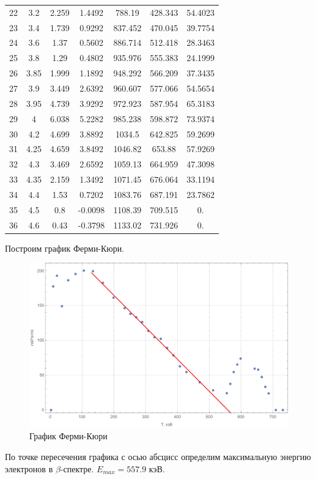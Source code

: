 \documentclass[a4paper, 12pt]{article}
\begin{document}
\begin{table}[!htb]
\begin{tabular}{|c|c|c|c|c|c|c|}
 22 & 3.2 & 2.259 & 1.4492 & 788.19 & 428.343 & 54.4023 \\
 23 & 3.4 & 1.739 & 0.9292 & 837.452 & 470.045 & 39.7754 \\
 24 & 3.6 & 1.37 & 0.5602 & 886.714 & 512.418 & 28.3463 \\
 25 & 3.8 & 1.29 & 0.4802 & 935.976 & 555.383 & 24.1999 \\
 26 & 3.85 & 1.999 & 1.1892 & 948.292 & 566.209 & 37.3435 \\
 27 & 3.9 & 3.449 & 2.6392 & 960.607 & 577.066 & 54.5654 \\
 28 & 3.95 & 4.739 & 3.9292 & 972.923 & 587.954 & 65.3183 \\
 29 & 4 & 6.038 & 5.2282 & 985.238 & 598.872 & 73.9374 \\
 30 & 4.2 & 4.699 & 3.8892 & 1034.5 & 642.825 & 59.2699 \\
 31 & 4.25 & 4.659 & 3.8492 & 1046.82 & 653.88 & 57.9269 \\
 32 & 4.3 & 3.469 & 2.6592 & 1059.13 & 664.959 & 47.3098 \\
 33 & 4.35 & 2.159 & 1.3492 & 1071.45 & 676.064 & 33.1194 \\
 34 & 4.4 & 1.53 & 0.7202 & 1083.76 & 687.191 & 23.7862 \\
 35 & 4.5 & 0.8 & -0.0098 & 1108.39 & 709.515 & 0. \\
 36 & 4.6 & 0.43 & -0.3798 & 1133.02 & 731.926 & 0. \\
				\hline
			\end{tabular}
		\end{table}
		\par
		Построим график Ферми-Кюри.
		\newpage
		\begin{figure}[!htb]
			\centering
			\includegraphics[width=\textwidth]{Fermi-Curie.pdf}
			\caption{График Ферми-Кюри}	
		\end{figure}
		По точке пересечения графика с осью абсцисс определим максимальную энергию электронов в $\beta$-спектре. 
$E_{max} = 557.9$ кэВ.
\end{document}
